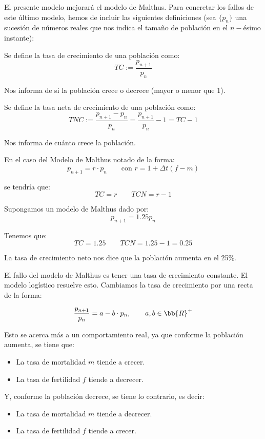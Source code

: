 El presente modelo mejorará el modelo de Malthus. Para concretar los fallos de este último modelo, hemos de incluir las siguientes definiciones (sea $\{p_n\}$ una sucesión de números reales que nos indica el tamaño de población en el $n-$ésimo instante):
\begin{definicion}
    Se define la tasa de crecimiento de una población como:
    \begin{equation*}
        TC :=\dfrac{p_{n+1}}{p_n}
    \end{equation*}

    Nos informa de si la población crece o decrece (mayor o menor que $1$).
\end{definicion}


\begin{definicion}
    Se define la tasa neta de crecimiento de una población como:
    \begin{equation*}
        TNC := \dfrac{p_{n+1}-p_n}{p_n} = \frac{p_{n+1}}{p_n}-1 = TC-1
    \end{equation*}

    Nos informa de cuánto crece la población.
\end{definicion}

En el caso del Modelo de Malthus notado de la forma:
\begin{equation*}
    p_{n+1} = r \cdot p_n \qquad 
    \text{con  }  r= 1+\Delta t(f-m)
\end{equation*}

se tendría que:
$$TC = r\qquad TCN = r-1$$

\begin{ejemplo}
    Supongamos un modelo de Malthus dado por:
    $$p_{n+1} = 1.25p_n$$

    Tenemos que:
    \begin{equation*}
        TC = 1.25
        \qquad
        TCN = 1.25 -1 = 0.25
    \end{equation*}
    
    La tasa de crecimiento neto nos dice que la población aumenta en el 25\%.
\end{ejemplo}

El fallo del modelo de Malthus es tener una tasa de crecimiento constante. El modelo logístico resuelve esto. Cambiamos la tasa de crecimiento por una recta de la forma:

$$\dfrac{p_{n+1}}{p_n} = a-b \cdot p_n, \qquad a,b \in \bb{R}^+$$
    
Esto se acerca más a un comportamiento real, ya que conforme la población aumenta, se tiene que:
\begin{itemize}
    \item La tasa de mortalidad $m$ tiende a crecer.
    \item La tasa de fertilidad $f$ tiende a decrecer.
\end{itemize}
Y, conforme la población decrece, se tiene lo contrario, es decir:
\begin{itemize}
    \item La tasa de mortalidad $m$ tiende a decrecer.
    \item La tasa de fertilidad $f$ tiende a crecer.
\end{itemize}

